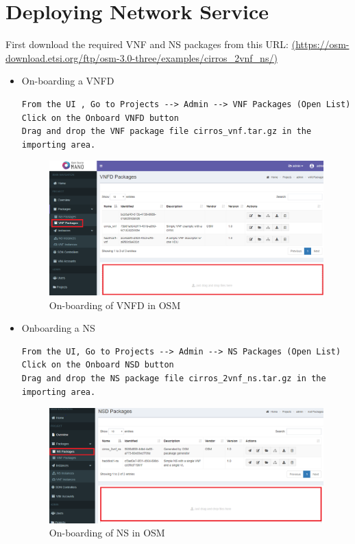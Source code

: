 \section{Deploying Network Service}
First download the required VNF and NS packages from this URL: \hyperlink{name}{(https://osm-download.etsi.org/ftp/osm-3.0-three/examples/cirros_2vnf_ns/)}
\begin{itemize}
\item On-boarding a VNFD
\begin{lstlisting}
From the UI , Go to Projects --> Admin --> VNF Packages (Open List)
Click on the Onboard VNFD button
Drag and drop the VNF package file cirros_vnf.tar.gz in the importing area.
\end{lstlisting}
\begin{figure} [H]
	\centering
	\includegraphics[width=0.5\linewidth]{figures/sh4}
	\caption{On-boarding of VNFD in OSM}
\end{figure}

\item Onboarding a NS
\begin{lstlisting}
From the UI, Go to Projects --> Admin --> NS Packages (Open List)
Click on the Onboard NSD button
Drag and drop the NS package file cirros_2vnf_ns.tar.gz in the importing area.
\end{lstlisting}
\begin{figure} [H]
	\centering
	\includegraphics[width=0.5\linewidth]{figures/sh3}
	\caption{On-boarding of NS in OSM}
\end{figure}



\end{itemize}
